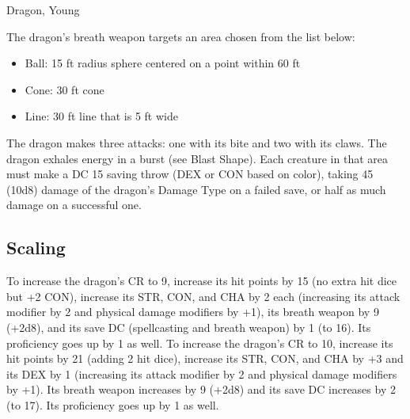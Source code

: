 \begin{DndMonster}[width=\textwidth + 8pt]{Dragon, Young}
\begin{multicols}{2}
 The dragon's breath weapon targets an area chosen from the list below:
\begin{itemize}
	\item[] Ball: 15 ft radius sphere centered on a point within 60 ft
	\item[] Cone: 30 ft cone
	\item[] Line: 30 ft line that is 5 ft wide
\end{itemize}

 The dragon makes three attacks: one with its bite and two with its claws.
\DndMonsterAttack[
	name=Bite,
	distance=melee,
	type=weapon,
	mod=+8,
	reach=10,
	dmg=\DndDice{2d10 + 5},
	dmg-type=piercing,
	extra={ plus 4 (1d8) damage of the dragon's Damage Type.}
]
\DndMonsterAttack[
	name=Claw,
	distance=melee,
	type=weapon,
	mod=+8,
	reach=5,
	dmg=\DndDice{2d6 + 5},
	dmg-type=slashing
]
The dragon exhales energy in a burst (see Blast Shape). Each creature in that area must make a DC 15 saving throw (DEX or CON based on color), taking 45 (10d8) damage of the dragon's Damage Type on a failed save, or half as much damage on a successful one.
\subsection{Scaling}
To increase the dragon's CR to 9, increase its hit points by 15 (no extra hit dice but +2 CON), increase its STR, CON, and CHA by 2 each (increasing its attack modifier by 2 and physical damage modifiers by +1), its breath weapon by 9 (+2d8), and its save DC (spellcasting and breath weapon) by 1 (to 16). Its proficiency goes up by 1 as well.
To increase the dragon's CR to 10, increase its hit points by 21 (adding 2 hit dice), increase its STR, CON, and CHA by +3 and its DEX by 1 (increasing its attack modifier by 2 and physical damage modifiers by +1). Its breath weapon increases by 9 (+2d8) and its save DC increases by 2 (to 17). Its proficiency goes up by 1 as well.
\end{multicols}
\end{DndMonster}
